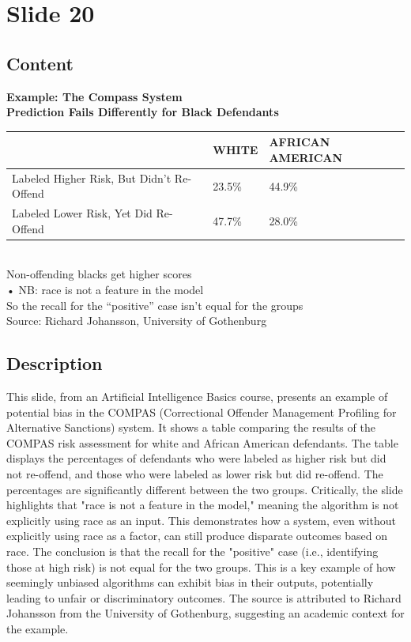 \documentclass{article}%
\begin{document}
%
\newpage%
\section{Slide 20}%
\label{sec:Slide20}%
\subsection{Content}%

\textbf{Example: The Compass System} \\
\textbf{Prediction Fails Differently for Black Defendants} \\
\begin{tabular}{ | l | l | l | } 
 \hline
 & WHITE & AFRICAN AMERICAN \\ 
 \hline
 Labeled Higher Risk, But Didn't Re-Offend & 23.5\% & 44.9\% \\ 
 \hline
 Labeled Lower Risk, Yet Did Re-Offend & 47.7\% & 28.0\% \\ 
 \hline
\end{tabular} \\
Non-offending blacks get higher scores \\
• NB: race is not a feature in the model \\
So the recall for the “positive” case isn’t equal for the groups \\
Source: Richard Johansson, University of Gothenburg
%
\subsection{Description}%
This slide, from an Artificial Intelligence Basics course, presents an example of potential bias in the COMPAS (Correctional Offender Management Profiling for Alternative Sanctions) system.  It shows a table comparing the results of the COMPAS risk assessment for white and African American defendants.  The table displays the percentages of defendants who were labeled as higher risk but did not re-offend, and those who were labeled as lower risk but did re-offend.  The percentages are significantly different between the two groups.  Critically, the slide highlights that "race is not a feature in the model," meaning the algorithm is not explicitly using race as an input.  This demonstrates how a system, even without explicitly using race as a factor, can still produce disparate outcomes based on race.  The conclusion is that the recall for the "positive" case (i.e., identifying those at high risk) is not equal for the two groups.  This is a key example of how seemingly unbiased algorithms can exhibit bias in their outputs, potentially leading to unfair or discriminatory outcomes. The source is attributed to Richard Johansson from the University of Gothenburg, suggesting an academic context for the example.%
\end{document}
